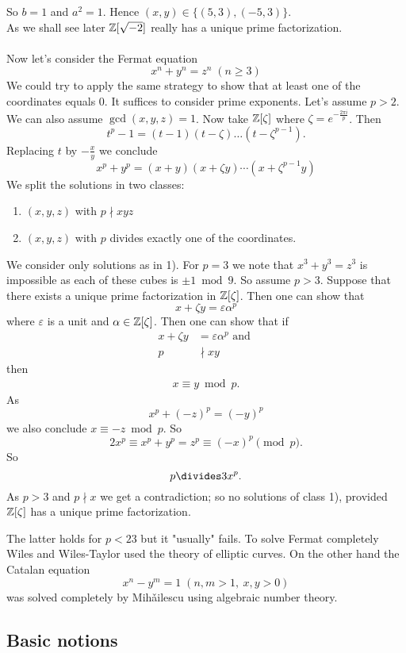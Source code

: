 \documentclass[NumTh.tex]{subfiles}
\begin{document}
So $b = 1$ and $a^2 = 1$.
Hence $(x,y) \in \{(5,3), (-5,3)\}$.
\\
As we shall see later $\mathbb{Z}[\sqrt{-2}]$ really has a unique prime factorization.\\
\\
Now let's consider the Fermat equation
\[ x^n + y^n = z^n \; (n\geq 3) \]
We could try to apply the same strategy to show that at least one of the coordinates equals $0$.
It suffices to consider prime exponents. Let's assume $p > 2$.
We can also assume $\gcd(x,y,z) = 1$.
Now take $\mathbb{Z}[\zeta]$ where $\zeta = e^{-\frac{2\pi i}{p}}$.
Then
\[ t^p - 1 = (t-1)(t-\zeta)\dots (t-\zeta^{p-1}) \text{.} \]
Replacing $t$ by $- \frac{x}{y}$ we conclude
\[ x^p + y^p = (x+y)(x + \zeta y) \cdots (x + \zeta^{p-1}y) \]
We split the solutions in two classes:
\begin{enumerate}
  \item $(x,y,z)$ with $p \nmid xyz$
  \item $(x,y,z)$ with $p$ divides exactly one of the coordinates.
\end{enumerate}
We consider only solutions as in 1).
For $p = 3$ we note that $x^3 + y^3 = z^3$ is impossible as each of these cubes is $\pm 1 \bmod 9$.
So assume $p>3$.
Suppose that there exists a unique prime factorization in $\mathbb{Z}[\zeta]$. 
Then one can show that 
\[ x + \zeta y = \varepsilon \alpha^p \] 
where $\varepsilon$ is a unit and $\alpha \in \mathbb{Z}[\zeta]$.
Then one can show that if
\begin{align*}
  x+ \zeta y &= \varepsilon \alpha^p \text{ and } \\ 
  p &\nmid xy
\end{align*}
then
\begin{align*}
  x \equiv y \bmod p \text{.}
\end{align*}
As 
\[ x^p + (-z)^p = (-y)^p\]
we also conclude $x  \equiv -z \bmod p$.
So 
\[ 2x^p \equiv x^p + y^p = z^p \equiv (-x)^p \pmod p \text{.} \]
So 
\[ p \divides 3 x^p \text{.} \]
As $p > 3$ and $p \nmid x$ we get a contradiction; so no solutions of class 1), provided $\mathbb{Z}[\zeta]$ has a unique prime factorization.

The latter holds for $p < 23$ but it "usually" fails.
To solve Fermat completely Wiles and Wiles-Taylor used the theory of elliptic curves.
On the other hand the Catalan equation
\[ x^n - y^m = 1 \; (n,m > 1,\:x,y >0) \]
was solved completely by Mih\v{a}ilescu using algebraic number theory.

\subsection{Basic notions}
\end{document}
